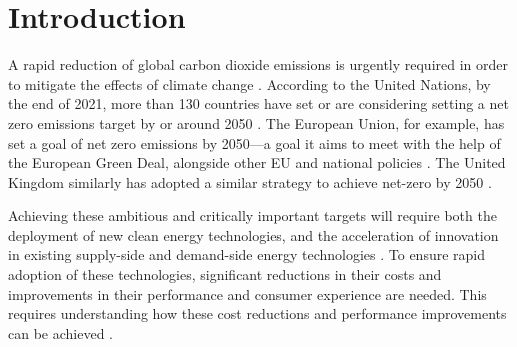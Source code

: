 \documentclass[twoside,twocolumn,9pt]{article}
\begin{document}
\section*{}
\vspace{-1cm}









\section{Introduction}

A rapid reduction of global carbon dioxide emissions is urgently required in order to mitigate the effects of climate change \cite{Forster2019}. According to the United Nations, by the end of 2021, more than 130 countries have set or are considering setting a net zero emissions target by or around 2050 \cite{un2021climate}. The European Union, for example, has set a goal of net zero emissions by 2050—a goal it aims to meet with the help of the European Green Deal, alongside other EU and national policies \cite{eu2020green}. The United Kingdom similarly has adopted a similar strategy to achieve net-zero by 2050 \cite{noauthor_ieairena_2023}.

Achieving these ambitious and critically important targets will require both the deployment of new clean energy technologies, and the acceleration of innovation in existing supply-side \cite{sinn2012green} and demand-side energy technologies \cite{rgeVorsatz2009}. To ensure rapid adoption of these technologies, significant reductions in their costs and improvements in their performance and consumer experience are needed. This requires understanding how these cost reductions and performance improvements can be achieved \cite{Stephan2021} \cite{Ziegler2021}.
\end{document}
